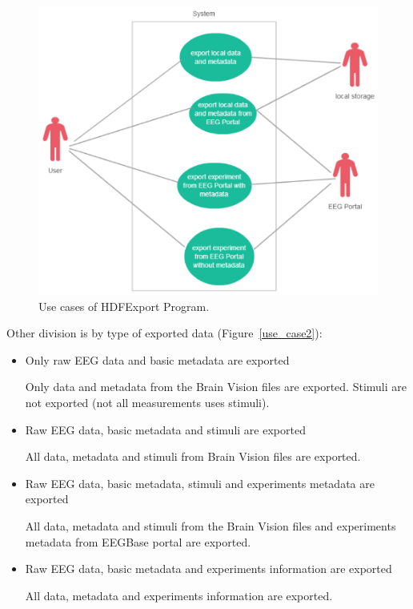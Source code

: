 \documentclass[conference]{IEEEtran}
\begin{document}
\begin{figure}
	\includegraphics[scale=0.5]{obrazky/use_case_location.pdf}	
	\caption{Use cases of HDFExport Program.}
	\label{use_case1}
\end{figure}
Other division is by type of exported data (Figure~\ref{use_case2}):
\begin{itemize}
	\item Only raw EEG data and basic metadata are exported
	
	Only data and metadata from the Brain Vision files are exported. Stimuli are not exported (not all measurements uses stimuli).
	\item Raw EEG data, basic metadata and stimuli are exported
	
	All data, metadata and stimuli from Brain Vision files are exported.
	\item Raw EEG data, basic metadata, stimuli and experiments metadata are exported
	
	All data, metadata and stimuli from the Brain Vision files and experiments metadata from EEGBase portal are exported.
	\item Raw EEG data, basic metadata and experiments information are exported
	
	All data, metadata and experiments information are exported.
\end{itemize}
\end{document}
